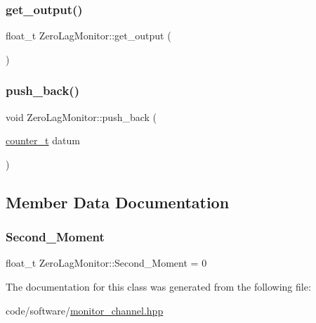 \subsubsection{\texorpdfstring{get\+\_\+output()}{get\_output()}}
{\footnotesize\ttfamily float\+\_\+t Zero\+Lag\+Monitor\+::get\+\_\+output (\begin{DoxyParamCaption}{ }\end{DoxyParamCaption})\hspace{0.3cm}{\ttfamily [inline]}}

\mbox{\label{classZeroLagMonitor_a22be76548cef864fba0a9c9125a57cce}} 
\subsubsection{\texorpdfstring{push\+\_\+back()}{push\_back()}}
{\footnotesize\ttfamily void Zero\+Lag\+Monitor\+::push\+\_\+back (\begin{DoxyParamCaption}\item[{\hyperlink{types_8hpp_a22f279793847eba127de149437848c48}{counter\+\_\+t}}]{datum }\end{DoxyParamCaption})\hspace{0.3cm}{\ttfamily [inline]}}



\subsection{Member Data Documentation}
\mbox{\label{classZeroLagMonitor_ad155a1aa85eba7a03b65c15649228006}} 
\subsubsection{\texorpdfstring{Second\+\_\+\+Moment}{Second\_Moment}}
{\footnotesize\ttfamily float\+\_\+t Zero\+Lag\+Monitor\+::\+Second\+\_\+\+Moment = 0}



The documentation for this class was generated from the following file\+:\begin{DoxyCompactItemize}
\item 
code/software/\hyperlink{monitor__channel_8hpp}{monitor\+\_\+channel.\+hpp}\end{DoxyCompactItemize}
